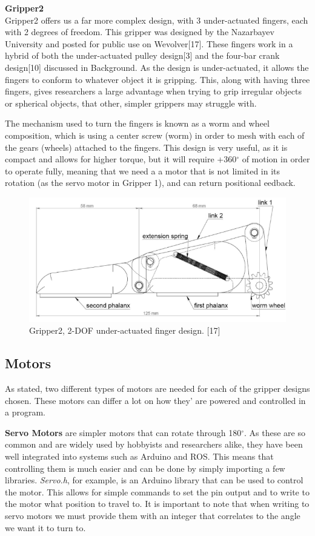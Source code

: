 \documentclass{l4proj}
\begin{document}
\textbf{Gripper2}\\
Gripper2 offers us a far more complex design, with 3 under-actuated fingers, each with 2 degrees of freedom. This gripper was designed by the Nazarbayev University and posted for public use on Wevolver[17]. These fingers work in a hybrid of both the under-actuated pulley design[3] and the four-bar crank design[10] discussed in Background. As the design is under-actuated, it allows the fingers to conform to whatever object it is gripping. This, along with having three fingers, gives researchers a large advantage when trying to grip irregular objects or spherical objects, that other, simpler grippers may struggle with. 

The mechanism used to turn the fingers is known as a worm and wheel composition, which is using a center screw (worm) in order to mesh with each of the gears (wheels) attached to the fingers. This design is very useful, as it is compact and allows for higher torque, but it will require +360$^{\circ}$ of motion in order to operate fully, meaning that we need a a motor that is not limited in its rotation (as the servo motor in Gripper 1), and can return positional eedback. 

\begin{figure}[!ht]
  \centering
  \includegraphics[width=0.75\linewidth]{images/gripper2_Finger.png}   
  \caption{Gripper2, 2-DOF under-actuated finger design. [17]}
  \label{fig:image1} 
\end{figure}

\subsection{Motors}
As stated, two different types of motors are needed for each of the gripper designs chosen. These motors can differ a lot on how they' are powered and controlled in a program.

\textbf{Servo Motors} are simpler motors that can rotate through 180$^{\circ}$. As these are so common and are widely used by hobbyists and researchers alike, they have been well integrated into systems such as Arduino and ROS. This means that controlling them is much easier and can be done by simply importing a few libraries. \textit{Servo.h}, for example, is an Arduino library that can be used to control the motor. This allows for simple commands to set the pin output and to write to the motor what position to travel to. It is important to note that when writing to servo motors we must provide them with an integer that correlates to the angle we want it to turn to. 
\end{document}
